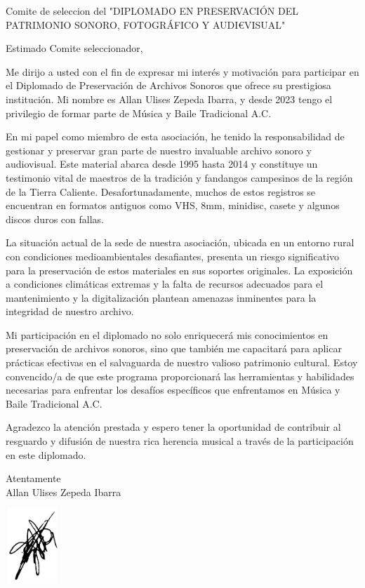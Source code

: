 \documentclass[a4paper,10pt]{letter}
\begin{document}
\begin{letter}{Comite de seleccion del "DIPLOMADO EN PRESERVACIÓN DEL PATRIMONIO SONORO, FOTOGRÁFICO Y AUDI€VISUAL"\\}

\opening{Estimado Comite seleccionador,}

Me dirijo a usted con el fin de expresar mi interés y motivación para participar en el Diplomado de Preservación de Archivos Sonoros que ofrece su prestigiosa institución. Mi nombre es Allan Ulises Zepeda Ibarra, y desde 2023 tengo el privilegio de formar parte de Música y Baile Tradicional A.C.

En mi papel como miembro de esta asociación, he tenido la responsabilidad de gestionar y preservar gran parte de nuestro invaluable archivo sonoro y audiovisual. Este material abarca desde 1995 hasta 2014 y constituye un testimonio vital de maestros de la tradición y fandangos campesinos de la región de la Tierra Caliente. Desafortunadamente, muchos de estos registros se encuentran en formatos antiguos como VHS, 8mm, minidisc, casete y algunos discos duros con fallas.

La situación actual de la sede de nuestra asociación, ubicada en un entorno rural con condiciones medioambientales desafiantes, presenta un riesgo significativo para la preservación de estos materiales en sus soportes originales. La exposición a condiciones climáticas extremas y la falta de recursos adecuados para el mantenimiento y la digitalización plantean amenazas inminentes para la integridad de nuestro archivo.

Mi participación en el diplomado no solo enriquecerá mis conocimientos en preservación de archivos sonoros, sino que también me capacitará para aplicar prácticas efectivas en el salvaguarda de nuestro valioso patrimonio cultural. Estoy convencido/a de que este programa proporcionará las herramientas y habilidades necesarias para enfrentar los desafíos específicos que enfrentamos en Música y Baile Tradicional A.C.

Agradezco la atención prestada y espero tener la oportunidad de contribuir al resguardo y difusión de nuestra rica herencia musical a través de la participación en este diplomado.



\closing{Atentamente\\ Allan Ulises Zepeda Ibarra}
\begin{center}
    \includegraphics[width=2cm]{firma.png} %
  \end{center}

\end{letter}
\end{document}
